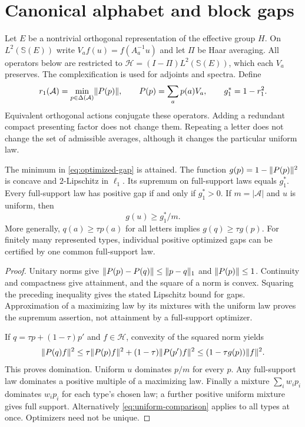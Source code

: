 \section{Canonical alphabet and block gaps}\label{sec:alphabet}
Let $E$ be a nontrivial orthogonal representation of the effective group $H$. On $L^2(\mathbb S(E))$ write $V_a f(u)=f(A_a^{-1}u)$ and let $\Pi$ be Haar averaging. All operators below are restricted to $\mathcal H=(I-\Pi)L^2(\mathbb S(E))$, which each $V_a$ preserves. The complexification is used for adjoints and spectra. Define
\begin{equation}\label{eq:optimized-gap}
 r_1(\mathcal A)=\min_{p\in\Delta(\mathcal A)}\lVert P(p)\rVert,\qquad
 P(p)=\sum_a p(a)V_a,\qquad g_1^*=1-r_1^2.
\end{equation}
Equivalent orthogonal actions conjugate these operators. Adding a redundant compact presenting factor does not change them. Repeating a letter does not change the set of admissible averages, although it changes the particular uniform law.

\begin{proposition}\label{prop:law}
The minimum in \eqref{eq:optimized-gap} is attained. The function $g(p)=1-\lVert P(p)\rVert^2$ is concave and $2$-Lipschitz in $\ell_1$. Its supremum on full-support laws equals $g_1^*$. Every full-support law has positive gap if and only if $g_1^*>0$. If $m=|\mathcal A|$ and $u$ is uniform, then
\begin{equation}\label{eq:uniform-comparison}
 g(u)\ge g_1^*/m.
\end{equation}
More generally, $q(a)\ge\tau p(a)$ for all letters implies $g(q)\ge\tau g(p)$. For finitely many represented types, individual positive optimized gaps can be certified by one common full-support law.
\end{proposition}
\begin{proof}
Unitary norms give $\lVert P(p)-P(q)\rVert\le\lVert p-q\rVert_1$ and $\lVert P(p)\rVert\le1$. Continuity and compactness give attainment, and the square of a norm is convex. Squaring the preceding inequality gives the stated Lipschitz bound for gaps. Approximation of a maximizing law by its mixtures with the uniform law proves the supremum assertion, not attainment by a full-support optimizer.

If $q=\tau p+(1-\tau)p'$ and $f\in\mathcal H$, convexity of the squared norm yields
\[
 \lVert P(q)f\rVert^2\le\tau\lVert P(p)f\rVert^2+(1-\tau)\lVert P(p')f\rVert^2
 \le(1-\tau g(p))\lVert f\rVert^2.
\]
This proves domination. Uniform $u$ dominates $p/m$ for every $p$. Any full-support law dominates a positive multiple of a maximizing law. Finally a mixture $\sum_i w_ip_i$ dominates $w_ip_i$ for each type's chosen law; a further positive uniform mixture gives full support. Alternatively \eqref{eq:uniform-comparison} applies to all types at once. Optimizers need not be unique.
\end{proof}


